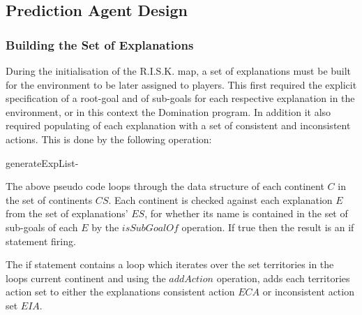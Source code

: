 \documentclass[parskip]{cs4rep}
\begin{document}
\subsection{Prediction Agent Design}

\subsubsection{Building the Set of Explanations}

During the initialisation of the R.I.S.K. map, a set of explanations must be built for the environment to be later assigned to players. This first required the explicit specification of a root-goal and of sub-goals for each respective explanation in the environment, or in this context the Domination program. In addition it also required populating of each explanation with a set of consistent and inconsistent actions. This is done by the following operation:

\begin{pseudocode}[ruled]{generateExpList}{-}
\begin{algorithm}[H]
\end{algorithm}
\end{pseudocode}

The above pseudo code loops through the data structure of each continent $C$ in the set of continents $CS$. Each continent is checked against each explanation $E$ from the set of explanations' $ES$, for whether its name is contained in the set of sub-goals of each $E$ by the $isSubGoalOf$ operation. If true then the result is an if statement firing. 

The if statement contains a loop which iterates over the set territories in the loops current continent and using the $addAction$ operation, adds each territories action set to either the explanations consistent action $ECA$ or inconsistent action set $EIA$.
\end{document}
